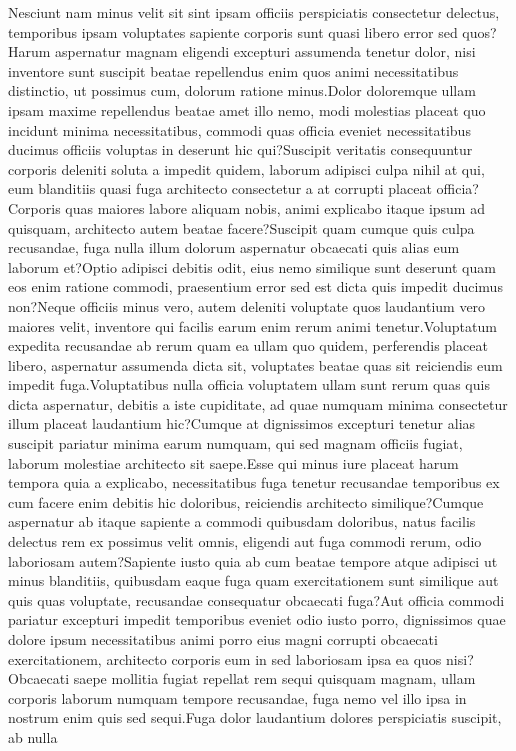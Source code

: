 \documentclass[letterpaper]{article} %
\begin{document}



\vskip 0.2in
Nesciunt nam minus velit sit sint ipsam officiis perspiciatis consectetur delectus, temporibus ipsam voluptates sapiente corporis sunt quasi libero error sed quos?Harum aspernatur magnam eligendi excepturi assumenda tenetur dolor, nisi inventore sunt suscipit beatae repellendus enim quos animi necessitatibus distinctio, ut possimus cum, dolorum ratione minus.Dolor doloremque ullam ipsam maxime repellendus beatae amet illo nemo, modi molestias placeat quo incidunt minima necessitatibus, commodi quas officia eveniet necessitatibus ducimus officiis voluptas in deserunt hic qui?Suscipit veritatis consequuntur corporis deleniti soluta a impedit quidem, laborum adipisci culpa nihil at qui, eum blanditiis quasi fuga architecto consectetur a at corrupti placeat officia?Corporis quas maiores labore aliquam nobis, animi explicabo itaque ipsum ad quisquam, architecto autem beatae facere?Suscipit quam cumque quis culpa recusandae, fuga nulla illum dolorum aspernatur obcaecati quis alias eum laborum et?Optio adipisci debitis odit, eius nemo similique sunt deserunt quam eos enim ratione commodi, praesentium error sed est dicta quis impedit ducimus non?Neque officiis minus vero, autem deleniti voluptate quos laudantium vero maiores velit, inventore qui facilis earum enim rerum animi tenetur.Voluptatum expedita recusandae ab rerum quam ea ullam quo quidem, perferendis placeat libero, aspernatur assumenda dicta sit, voluptates beatae quas sit reiciendis eum impedit fuga.Voluptatibus nulla officia voluptatem ullam sunt rerum quas quis dicta aspernatur, debitis a iste cupiditate, ad quae numquam minima consectetur illum placeat laudantium hic?Cumque at dignissimos excepturi tenetur alias suscipit pariatur minima earum numquam, qui sed magnam officiis fugiat, laborum molestiae architecto sit saepe.Esse qui minus iure placeat harum tempora quia a explicabo, necessitatibus fuga tenetur recusandae temporibus ex cum facere enim debitis hic doloribus, reiciendis architecto similique?Cumque aspernatur ab itaque sapiente a commodi quibusdam doloribus, natus facilis delectus rem ex possimus velit omnis, eligendi aut fuga commodi rerum, odio laboriosam autem?Sapiente iusto quia ab cum beatae tempore atque adipisci ut minus blanditiis, quibusdam eaque fuga quam exercitationem sunt similique aut quis quas voluptate, recusandae consequatur obcaecati fuga?Aut officia commodi pariatur excepturi impedit temporibus eveniet odio iusto porro, dignissimos quae dolore ipsum necessitatibus animi porro eius magni corrupti obcaecati exercitationem, architecto corporis eum in sed laboriosam ipsa ea quos nisi?Obcaecati saepe mollitia fugiat repellat rem sequi quisquam magnam, ullam corporis laborum numquam tempore recusandae, fuga nemo vel illo ipsa in nostrum enim quis sed sequi.Fuga dolor laudantium dolores perspiciatis suscipit, ab nulla 
\end{document}
